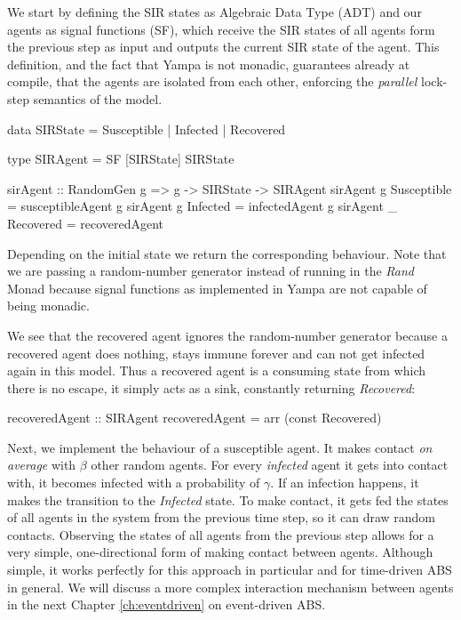 We start by defining the SIR states as Algebraic Data Type (ADT) and our agents as signal functions (SF), which receive the SIR states of all agents form the previous step as input and outputs the current SIR state of the agent. This definition, and the fact that Yampa is not monadic, guarantees already at compile, that the agents are isolated from each other, enforcing the \textit{parallel} lock-step semantics of the model.

\begin{HaskellCode}
data SIRState = Susceptible | Infected | Recovered

type SIRAgent = SF [SIRState] SIRState 

sirAgent :: RandomGen g => g -> SIRState -> SIRAgent
sirAgent g Susceptible = susceptibleAgent g
sirAgent g Infected    = infectedAgent g
sirAgent _ Recovered   = recoveredAgent
\end{HaskellCode}

Depending on the initial state we return the corresponding behaviour. Note that we are passing a random-number generator instead of running in the \textit{Rand} Monad because signal functions as implemented in Yampa are not capable of being monadic. 

We see that the recovered agent ignores the random-number generator because a recovered agent does nothing, stays immune forever and can not get infected again in this model. Thus a recovered agent is a consuming state from which there is no escape, it simply acts as a sink, constantly returning \textit{Recovered}:

\begin{HaskellCode}
recoveredAgent :: SIRAgent
recoveredAgent = arr (const Recovered)
\end{HaskellCode}

Next, we implement the behaviour of a susceptible agent. It makes contact \textit{on average} with $\beta$ other random agents. For every \textit{infected} agent it gets into contact with, it becomes infected with a probability of $\gamma$. If an infection happens, it makes the transition to the \textit{Infected} state. To make contact, it gets fed the states of all agents in the system from the previous time step, so it can draw random contacts. Observing the states of all agents from the previous step allows for a very simple, one-directional form of making contact between agents. Although simple, it works perfectly for this approach in particular and for time-driven ABS in general. We will discuss a more complex interaction mechanism between agents in the next Chapter \ref{ch:eventdriven} on event-driven ABS.

